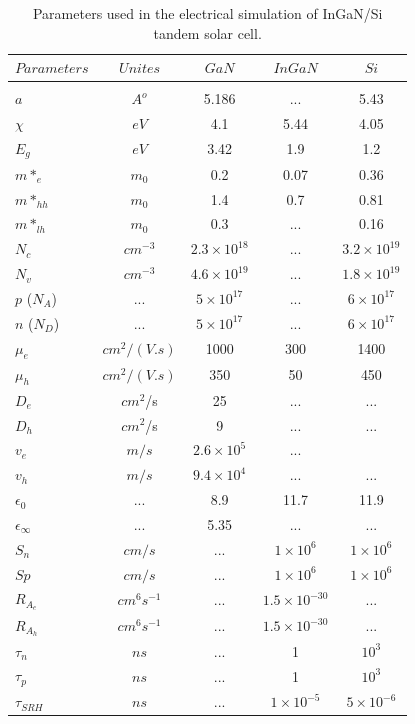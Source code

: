 \documentclass[preprint,12pt]{elsarticle}
\begin{document}
\begin{table}[]
	\centering
	\begin{tabular}{@{}lcccc@{}}
		\toprule
		$Parameters$ & $Unites$ & $GaN$ & $InGaN$ & $Si$ \\ \midrule
	&  &  &  &  \\
	$a$ & $A^{o}$ & 5.186 & ... & 5.43 \\
	$\chi$ & $eV$ & 4.1 & 5.44 & 4.05 \\
	$E_{g}$ & $eV$ & 3.42 & 1.9 & 1.2 \\
				
	$m*_e$ & $m_{0}$ & 0.2 & 0.07 & 0.36 \\
		
	$m*_{hh}$ & $m_{0}$ & 1.4 & 0.7 & 0.81 \\
	$m*_{lh}$ & $m_{0}$ & 0.3 & ... & 0.16 \\
		
	$N_c$ & $cm^{-3}$ & $2.3\times10^{18}$ & ... & $3.2\times10^{19}$ \\
	$N_v$ & $cm^{-3}$ & $4.6\times10^{19}$ & ... & $1.8\times10^{19}$ \\
		
	$p$ ($N_A$)  & ... & $5\times 10^{17}$ & ... & $6\times 10^{17}$ \\
	
	$n$ ($N_D$) & ... &  $5\times 10^{17} $ & ... & $6\times 10^{17} $ \\
		
	$\mu_{e}$ & $cm^{2}/( V.s)$ & 1000 & 300 & 1400 \\
	$\mu_{h}$ & $cm^{2}/( V.s)$ & 350 & 50 & 450 \\
	$D_{e}$ & $cm^{2}$/s & 25 & ... & ... \\
	$D_{h}$ & $cm^{2}$/s & 9 & ... & ... \\
	$v_{e}$ & $m/s$ & $2.6\times 10^{5}$ & ... &  \\
	$v_{h}$ & $m/s$ & $9.4\times 10^{4}$ & ... & ... \\
	$\epsilon_{0}$ & ... & 8.9 & 11.7 & 11.9 \\
	$\epsilon_{\infty}$ & ... & 5.35 & ... & ... \\
	$S_{n}$ & $cm/s$ & ... & $1\times 10^{6}$ & $1\times 10^{6}$ \\
	$Sp$ & $cm/s$ & ... & $1\times 10^{6}$ & $1\times 10^{6}$ \\
	$R_{A_{e}}$ & $cm^{6}s^{−1}$ & ... & $1.5 \times10^{-30}$ & ... \\
	$R_{A_{h}}$ & $cm^{6}s^{−1}$ & ... & $1.5 \times 10^{-30}$ & ... \\
					
	$\tau_{n}$ & $ns$ & ... & 1 & $10^{3}$ \\
	$\tau_{p}$ & $ns$ & ... & 1 & $10^{3}$ \\
	$\tau_{SRH}$ & $ns$ & ... & $1\times 10^{-5}$ & $5\times 10^{-6}$ \\ \bottomrule
	\end{tabular}
	\caption{Parameters used in the electrical simulation of InGaN/Si tandem solar cell.}
	\label{tab:parametres}
\end{table}
\end{document}
